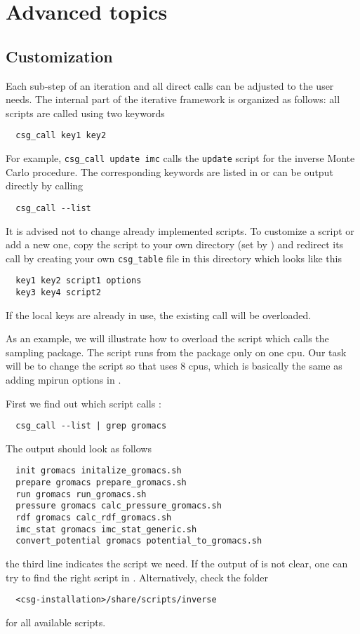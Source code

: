 \chapter{Advanced topics}
\label{sec:advanced_topics}

\section{Customization}
Each sub-step of an iteration and all direct calls can be adjusted to the user needs. The internal part of the iterative framework is organized as follows: all scripts are called using two keywords
\begin{verbatim}
  csg_call key1 key2
\end{verbatim}
For example, \texttt{csg\_call update imc} calls the \texttt{update} script for the inverse Monte Carlo procedure. The corresponding keywords are listed in  or can be output directly by calling
\begin{verbatim}
  csg_call --list
\end{verbatim}

It is advised not to change already implemented scripts. To customize a script or add a new one, copy the script to your own directory (set by ) and redirect its call by creating your own \texttt{csg\_table} file in this directory which looks like this
\begin{verbatim}
  key1 key2 script1 options
  key3 key4 script2
\end{verbatim}
If the local keys are already in use, the existing call will be overloaded.

As an example, we will illustrate how to overload the script which calls the sampling package. 
The  script runs  from the \gromacs package only on one cpu. Our task will be to change the script so that \gromacs uses 8 cpus, which is basically the same as adding mpirun options in .

First we find out which script calls :
\begin{verbatim}
  csg_call --list | grep gromacs
\end{verbatim}
The output should look as follows
\begin{verbatim}
  init gromacs initalize_gromacs.sh
  prepare gromacs prepare_gromacs.sh
  run gromacs run_gromacs.sh
  pressure gromacs calc_pressure_gromacs.sh
  rdf gromacs calc_rdf_gromacs.sh
  imc_stat gromacs imc_stat_generic.sh
  convert_potential gromacs potential_to_gromacs.sh
\end{verbatim}
the third line indicates the script we need. If the output of  is not clear, one can try to find the right script in . Alternatively, check the folder
\begin{verbatim}
  <csg-installation>/share/scripts/inverse
\end{verbatim}
for all available scripts. 

